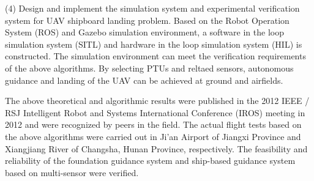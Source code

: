 \begin{eabstract}
(4) Design and implement the simulation system and experimental verification system for UAV shipboard landing problem. Based on the Robot Operation System (ROS) and Gazebo simulation environment, a software in the loop simulation system (SITL) and hardware in the loop simulation system (HIL) is constructed. The simulation environment can meet the verification requirements of the above algorithms. By selecting PTUs and reltaed sensors, autonomous guidance and landing of the UAV can be achieved at ground and airfields.

The above theoretical and algorithmic results were published in the 2012 IEEE / RSJ Intelligent Robot and Systems International Conference (IROS) meeting in 2012 and were recognized by peers in the field. The actual flight tests based on the above algorithms were carried out in Ji'an Airport of Jiangxi Province and Xiangjiang River of Changsha, Hunan Province, respectively. The feasibility and reliability of the foundation guidance system and ship-based guidance system based on multi-sensor were verified.
 
 
\end{eabstract}

